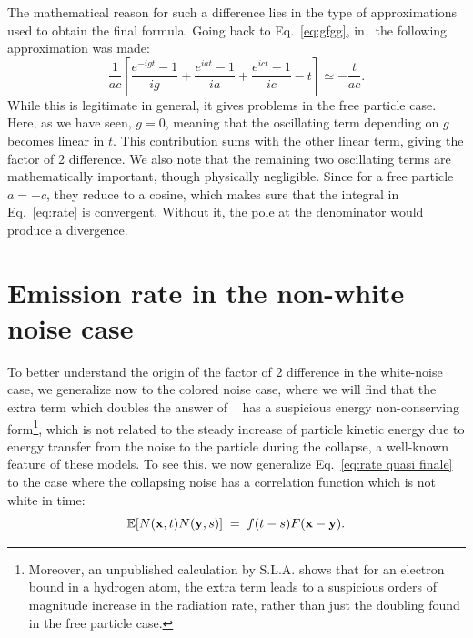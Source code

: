 \documentclass[12pt,onecolumn,amssymb,nofootinbib]{revtex4-2} %
\begin{document}
The mathematical reason for such a difference lies in the type of
approximations used to obtain the final formula.  Going back to
Eq.~\eqref{eq:gfgg}, in~\cite{ref:ar} the following approximation was made:
\begin{equation}
\frac{1}{ac}\left[\frac{e^{-igt}-1}{ig}+\frac{e^{iat}-1}{ia}+
\frac{e^{ict}-1}{ic}-t\right]\simeq-\frac{t}{ac}.
\end{equation}
While this is legitimate in general, it gives problems in the free particle
case. Here, as we have seen, $g=0$, meaning that the oscillating term depending
on $g$ becomes linear in $t$. This contribution sums with the other linear
term, giving the factor of 2 difference. We also note that the remaining
two oscillating terms are mathematically important, though physically
negligible. Since for a free particle $a=-c$, they reduce to a cosine, which
makes sure that the integral in Eq.~\eqref{eq:rate} is convergent. Without it,
the pole at the denominator would produce a divergence.

\section{Emission rate in the non-white noise case}

To better understand the origin of the factor of 2 difference in the white-noise case, we generalize now to
the colored noise case, where we will find that the extra term which doubles the answer of ~\cite{ref:fu,ref:ar}
has a suspicious energy non-conserving form\footnote{Moreover, an unpublished calculation by S.L.A. shows that for an electron bound in a hydrogen atom,
the extra term leads to a suspicious orders of magnitude increase in the radiation rate, rather than just the
doubling found in the free particle case.}, which is not related to the steady increase of particle kinetic
energy due to energy transfer from the noise to the particle during the collapse, a well-known feature of these models.
To see this, we now generalize Eq.~\eqref{eq:rate quasi finale} to the case where the collapsing
noise has a correlation function which is not white in time:
\begin{equation} \label{eq:sdfddasbis2}
{\mathbb E}[N(\mathbf{x},t) N(\mathbf{y},s)] \; = \;
f(t-s)F({\bf x} - {\bf y}).
\end{equation}
\end{document}
